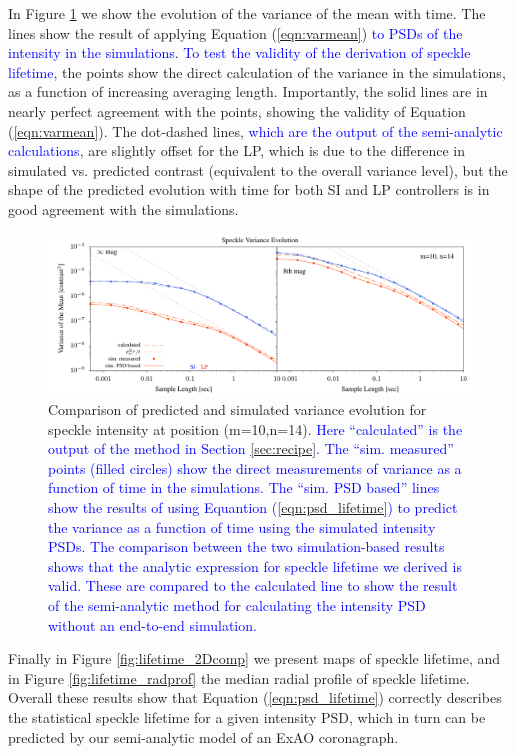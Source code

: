 \documentclass[10pt,preprint]{aastex631}
\newcommand{\jrmadd}[1]{\textcolor{blue}{#1}}
\begin{document}
In Figure \ref{fig:binvarcomp} we show the evolution of the variance of the mean with time.  The lines show the result of applying Equation (\ref{eqn:varmean})  \jrmadd{to PSDs of the intensity in the simulations}. \jrmadd{To test the validity of the derivation of speckle lifetime,} the points show the direct calculation of the variance in the simulations, as a function of increasing averaging length.   Importantly, the solid lines are in nearly perfect agreement with the points, showing the validity of Equation (\ref{eqn:varmean}).  The dot-dashed lines, \jrmadd{which are the output of the semi-analytic calculations}, are slightly offset for the LP, which is due to the difference in simulated vs. predicted contrast (equivalent to the overall variance level), but the shape of the predicted evolution with time for both SI and LP controllers is in good agreement with the simulations.

\begin{figure}
\hspace{-0.3in}
\includegraphics[width=6.5in]{binVarComp_lp_10_14.pdf}
\caption{Comparison of predicted and simulated variance evolution for speckle intensity at position (m=10,n=14).  \jrmadd{Here ``calculated'' is the output of the method in Section \ref{sec:recipe}.  The ``sim. measured'' points (filled circles) show the direct measurements of variance as a function of time in the simulations.  The ``sim. PSD based'' lines show the results of using Equantion (\ref{eqn:psd_lifetime}) to predict the variance as a function of time using the simulated intensity PSDs.  The comparison between the two simulation-based results shows that the analytic expression for speckle lifetime we derived is valid.  These are compared to the calculated line to show the result of the semi-analytic method for calculating the intensity PSD without an end-to-end simulation.}  \label{fig:binvarcomp}}
\end{figure}

Finally in Figure \ref{fig:lifetime_2Dcomp} we present maps of speckle lifetime, and in Figure \ref{fig:lifetime_radprof} the median radial profile of speckle lifetime.  Overall these results show that Equation (\ref{eqn:psd_lifetime}) correctly describes the statistical speckle lifetime for a given intensity PSD, which in turn can be predicted by our semi-analytic model of an ExAO coronagraph.
\end{document}
